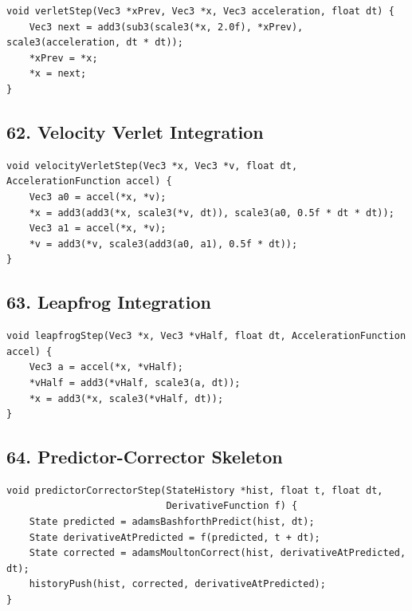 \documentclass[10pt,letterpaper]{article}
\begin{document}
\begin{verbatim}
void verletStep(Vec3 *xPrev, Vec3 *x, Vec3 acceleration, float dt) {
    Vec3 next = add3(sub3(scale3(*x, 2.0f), *xPrev), scale3(acceleration, dt * dt));
    *xPrev = *x;
    *x = next;
}
\end{verbatim}

\subsection*{62. Velocity Verlet Integration}

\begin{verbatim}
void velocityVerletStep(Vec3 *x, Vec3 *v, float dt, AccelerationFunction accel) {
    Vec3 a0 = accel(*x, *v);
    *x = add3(add3(*x, scale3(*v, dt)), scale3(a0, 0.5f * dt * dt));
    Vec3 a1 = accel(*x, *v);
    *v = add3(*v, scale3(add3(a0, a1), 0.5f * dt));
}
\end{verbatim}

\subsection*{63. Leapfrog Integration}

\begin{verbatim}
void leapfrogStep(Vec3 *x, Vec3 *vHalf, float dt, AccelerationFunction accel) {
    Vec3 a = accel(*x, *vHalf);
    *vHalf = add3(*vHalf, scale3(a, dt));
    *x = add3(*x, scale3(*vHalf, dt));
}
\end{verbatim}

\subsection*{64. Predictor-Corrector Skeleton}

\begin{verbatim}
void predictorCorrectorStep(StateHistory *hist, float t, float dt,
                            DerivativeFunction f) {
    State predicted = adamsBashforthPredict(hist, dt);
    State derivativeAtPredicted = f(predicted, t + dt);
    State corrected = adamsMoultonCorrect(hist, derivativeAtPredicted, dt);
    historyPush(hist, corrected, derivativeAtPredicted);
}
\end{verbatim}
\end{document}
